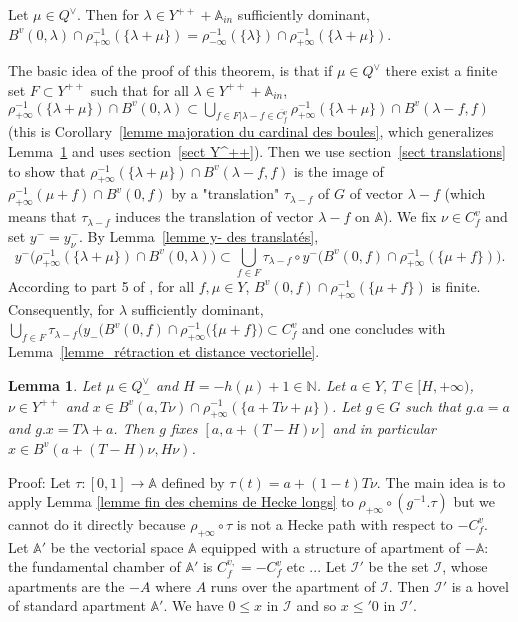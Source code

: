 \documentclass[12pt]{article}
\theoremstyle{plain}
\newtheorem{lemme}[thm]{Lemma}
\theoremstyle{definition}
\newcommand{\A}{\mathbb{A}}
\newcommand{\N}{\mathbb{N}}
\newcommand{\I}{\mathcal{I}}
\begin{document}
 Let $\mu\in Q^\vee$. Then for $\lambda\in Y^{++}+\A_{in}$ sufficiently dominant, $B^v(0,\lambda)\cap \rho_{+\infty}^{-1}(\{\lambda+\mu\})=\rho_{-\infty}^{-1}(\{\lambda\})\cap\rho_{+\infty}^{-1}(\{\lambda+\mu\})$.

The basic idea of the proof of this theorem, is that if $\mu\in Q^\vee$ there exist a finite set $F\subset Y^{++}$ such that for all $\lambda\in Y^{++}+\A_{in}$, $\rho_{+\infty}^{-1}(\{\lambda+\mu\})\cap B^v(0,\lambda) \subset \bigcup_{f\in F|\lambda-f\in\overline{C^v_f}} \rho_{+\infty}^{-1}(\{\lambda+\mu\})\cap B^v(\lambda-f,f)$ (this is Corollary~\ref{lemme majoration du cardinal des boules}, which generalizes Lemma~\ref{lemme distance finie à l'appartement} and uses section~\ref{sect Y^++}). Then we use section~\ref{sect translations} to show  that $\rho_{+\infty}^{-1}(\{\lambda+\mu\})\cap B^v(\lambda-f,f)$ is the image of $\rho_{+\infty}^{-1}(\mu+f)\cap B^v(0,f)$ by a "translation" $\tau_{\lambda-f}$ of $G$ of vector $\lambda-f$ (which means that $\tau_{\lambda-f}$ induces the translation of vector $\lambda-f$ on $\mathbb{A}$). We fix $\nu\in C_f^v$ and set $y^-=y_\nu^-$. By Lemma~\ref{lemme y- des translatés},  \[y^-\big(\rho_{+\infty}^{-1}(\{\lambda+\mu\})\cap B^v(0,\lambda)\big)\subset\bigcup_{f\in F}\tau_{\lambda-f}\circ y^-\big(B^v(0,f)\cap \rho_{+\infty}^{-1}(\{\mu +f\})\big).\] According to part 5 of \cite{gaussent2014spherical}, for all $f, \mu \in Y$, $B^v(0,f)\cap \rho_{+\infty}^{-1}(\{\mu +f\})$ is finite. Consequently, for $\lambda$ sufficiently dominant, $\bigcup_{f\in F}\tau_{\lambda-f}\big(y_-(B^v(0,f)\cap \rho_{+\infty}^{-1}(\{\mu +f\}\big)\subset C^v_f$  and one concludes with Lemma~\ref{lemme_rétraction et distance vectorielle}. 
 



\begin{lemme}\label{lemme distance finie à l'appartement}
Let $\mu\in Q^\vee_-$ and $H=-h(\mu)+1\in \N$. Let $a\in Y$, $T\in [H,+\infty)$, $\nu\in Y^{++}$ and $x\in B^v(a,T\nu)\cap\rho_{+\infty}^{-1}(\{a+T\nu+\mu\})$. Let $g\in G$ such that $g.a=a$ and $g.x=T\lambda+a$. Then $g$ fixes $[a,a+(T-H)\nu]$ and in particular $x\in B^v(a+(T-H)\nu,H\nu)$.
\end{lemme}

Proof: Let $\tau:[0,1]\rightarrow \mathbb{A}$ defined by $\tau(t)=a+(1-t)T\nu$. The main idea is to apply Lemma \ref{lemme fin des chemins de Hecke longs} to $\rho_{+\infty}\circ (g^{-1}.\tau)$ but we cannot do it directly because $\rho_{+\infty}\circ\tau$ is not a Hecke path with respect to $-C^v_f$. Let $\mathbb{A}'$ be the vectorial space $\mathbb{A}$ equipped with a structure of apartment of $-\mathbb{A}$: the fundamental chamber of $\mathbb{A}'$ is $C^{v,}_f=-C^v_f$ etc ... Let $\mathcal{I}'$ be the set $\mathcal{I}$, whose apartments are the $-A$ where $A$ runs over the apartment of $\I$. Then $\mathcal{I}'$ is a hovel of standard apartment $\mathbb{A}'$. We have $0\leq x$ in $\mathcal{I}$ and so $x\leq'0$ in $\mathcal{I}'$. 
 
\end{document}
